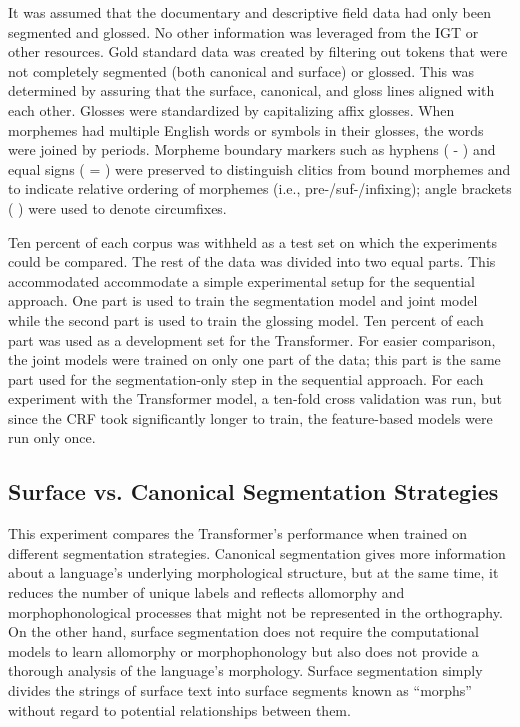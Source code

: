 It was assumed that the documentary and descriptive field data had only been segmented and glossed. No other information was leveraged from the IGT or other resources. Gold standard data was created by filtering out tokens that were not completely segmented (both canonical and surface) or glossed. This was determined by assuring that the surface, canonical, and gloss lines aligned with each other. 
Glosses were standardized by capitalizing affix glosses. When morphemes had multiple English words or symbols in their glosses, the words were joined by periods.
Morpheme boundary markers such as hyphens ( - ) and equal signs ( = ) were preserved to distinguish clitics from bound morphemes and to indicate relative ordering of morphemes (i.e., pre-/suf-/infixing); angle brackets ( \textlangle{}\textrangle{} ) were used to denote circumfixes. 

Ten percent of each corpus was withheld as a test set on which the experiments could be compared. The rest of the data was divided into two equal parts. This accommodated accommodate a simple experimental setup for the sequential approach. One part is used to train the segmentation model and joint model while the second part is used to train the glossing model. Ten percent of each part was used as a development set for the Transformer. For easier comparison, the joint models were trained on only one part of the data; this part is the same part used for the segmentation-only step in the sequential approach. For each experiment with the Transformer model, a ten-fold cross validation was run, but since the CRF took significantly longer to train, the feature-based models were run only once.


\subsection{Surface vs. Canonical Segmentation Strategies}
\label{sec:sgstrategies}

This experiment compares the Transformer's performance when trained on different segmentation strategies. Canonical segmentation gives more information about a language's underlying morphological structure, but at the same time, it reduces the number of unique labels and reflects allomorphy and morphophonological processes that might not be represented in the orthography. On the other hand, surface segmentation does not require the computational models to learn allomorphy or morphophonology \citep{goldsmith_computational_2017} but also does not provide a thorough analysis of the language's morphology. Surface segmentation simply divides the strings of surface text into surface segments known as ``morphs'' without regard to potential relationships between them. 

